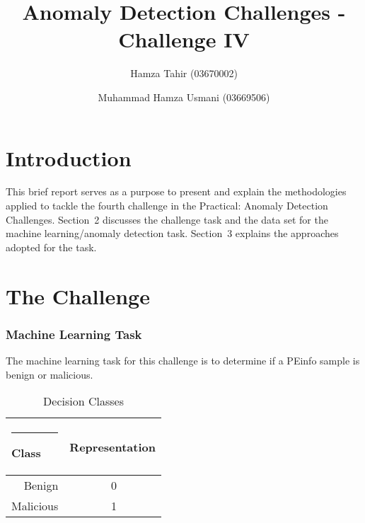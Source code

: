\documentclass{llncs}
\begin{document}
%
\frontmatter          %
%
\pagestyle{headings}  %

\mainmatter              %
%
\title{Anomaly Detection Challenges - Challenge IV}
%

%
\author{Hamza Tahir (03670002) \and Muhammad Hamza Usmani (03669506)}
%
%

\maketitle              %


%
\section{Introduction}
%
This brief report serves as a purpose to present and explain the methodologies applied to tackle the fourth challenge in the Practical: Anomaly Detection Challenges. Section~2 discusses the challenge task and the data set for the machine learning/anomaly detection task. Section~3 explains the approaches adopted for the task.
%
\section{The Challenge}
%
%
\subsubsection{Machine Learning Task}
%
The machine learning task for this challenge is to determine if a PEinfo sample is benign or malicious.
\begin{table}
\caption{Decision Classes}
\begin{center}
\begin{tabular}{r@{\quad}rl}
\hline
\multicolumn{1}{l}{\rule{2pt}{0pt}
Class}&\multicolumn{2}{l}{Representation}\\[2pt]
\hline\rule{0pt}{12pt}
Benign&    0& \\
Malicious&     1& \\[2pt]
\hline
\end{tabular}
\end{center}
\end{table}
%
\end{document}

